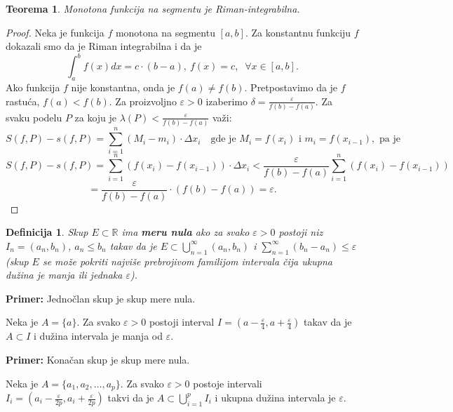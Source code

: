 \documentclass[a4paper,12pt,twoside]{report}
\newtheorem{theorem}{Teorema}[section]
\newtheorem{definition}{Definicija}[section]
\numberwithin{algorithm}{section}
\begin{document}
\begin{theorem}
    Monotona funkcija na segmentu je Riman-integrabilna.
\end{theorem}

\begin{proof}
    Neka je funkcija \(f\) monotona na segmentu \([a, b]\).
    Za konstantnu funkciju \(f\) dokazali smo da je Riman integrabilna i da je \[\int_a^b f(x) dx = c \cdot (b-a), \ f(x) = c, \;\; \forall x \in [a, b].\]
    Ako funkcija \(f\) nije konstantna, onda je \(f(a) \neq f(b)\).
    Pretpostavimo da je \(f\) rastuća, \(f(a) < f(b)\).
    Za proizvoljno \(\varepsilon > 0\) izaberimo \(\delta = \frac{\varepsilon}{f(b)-f(a)}\).
    Za svaku podelu \(P\) za koju je \(\lambda(P) < \frac{\varepsilon}{f(b)-f(a)}\) važi:
    \[
        S(f, P) - s(f, P) = \sum_{i=1}^n (M_i - m_i) \cdot \Delta x_i \quad \text{gde je } M_i = f(x_i) \text{ i } m_i = f(x_{i-1}), \text{ pa je}
    \]
    \[
        S(f, P) - s(f, P) = \sum_{i=1}^n (f(x_i) - f(x_{i-1})) \cdot \Delta x_i < \frac{\varepsilon}{f(b)-f(a)} \sum_{i=1}^n (f(x_i) - f(x_{i-1}))
    \]
    \[
         = \frac{\varepsilon}{f(b)-f(a)} \cdot (f(b) - f(a)) = \varepsilon.
    \]
\end{proof}

\begin{definition}
    Skup \(E \subset \mathbb{R}\) ima \textbf{meru nula} ako za svako \(\varepsilon > 0\) postoji niz \(I_n = (a_n, b_n)\), \(a_n \leq b_n\) takav da je \(E \subset \bigcup_{n=1}^\infty (a_n, b_n)\) i \(\sum_{n=1}^\infty (b_n - a_n) \leq \varepsilon\) (skup \(E\) se može pokriti najviše prebrojivom familijom intervala čija ukupna dužina je manja ili jednaka \(\varepsilon\)).
\end{definition}

\medskip

\noindent\textbf{Primer:} Jednočlan skup je skup mere nula.

Neka je \(A = \{a\}\). Za svako \(\varepsilon > 0\) postoji interval \(I = (a - \frac{\varepsilon}{4}, a + \frac{\varepsilon}{4})\) takav da je \(A \subset I\) i dužina intervala je manja od \(\varepsilon\).
\\
\medskip

\noindent\textbf{Primer:} Konačan skup je skup mere nula.

Neka je \(A = \{a_1, a_2, \dots, a_p\}\). Za svako \(\varepsilon > 0\) postoje intervali \(I_i = (a_i - \frac{\varepsilon}{2p}, a_i + \frac{\varepsilon}{2p})\) takvi da je \(A \subset \bigcup_{i=1}^p I_i\) i ukupna dužina intervala je \(\varepsilon\).
\\
\medskip
\end{document}
